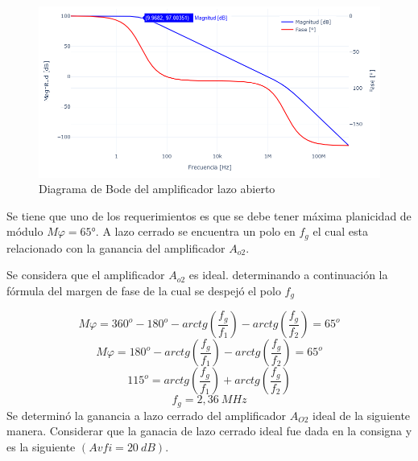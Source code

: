 \begin{figure}[h!]
  \centering
    \includegraphics[scale=0.7]{TP3_bode_lm324.png}
    \caption{Diagrama de Bode del amplificador lazo abierto}
\end{figure}

\bigskip
\hspace{1mm} Se tiene que uno de los requerimientos es que se debe tener máxima planicidad de módulo \(M\varphi =65°\).  A lazo cerrado se encuentra un polo en \(f_g\) el cual esta relacionado con la ganancia del amplificador \(A_{o2}\).
\bigskip

\hspace{1mm} Se considera que el amplificador \(A_{o2}\) es ideal. determinando a continuación la fórmula del margen de fase de la cual se despejó el polo \( 
f_g \)
 
\begin{equation}
    M \varphi = 360^o - 180^o - arctg \left( \frac{f_g}{f_1} \right) - arctg \left( \frac{f_g}{f_2} \right) = 65^o
\end{equation}
\begin{equation}
    M \varphi = 180^o - arctg \left( \frac{f_g}{f_1} \right) - arctg \left( \frac{f_g}{f_2} \right) = 65^o
\end{equation}
\begin{equation}
    115^o = arctg \left( \frac{f_g}{f_1} \right) + arctg \left( \frac{f_g}{f_2} \right)
\end{equation}
\begin{equation}
    \boxed{
    f_g = 2,36~MHz
    }
\end{equation}
\bigskip
\hspace{1mm} Se determinó la ganancia a lazo cerrado del amplificador \(A_{O2}\) ideal de la siguiente manera. Considerar que la ganacia de lazo cerrado ideal fue dada en la consigna y es la siguiente \((Avfi=20~dB)\).


